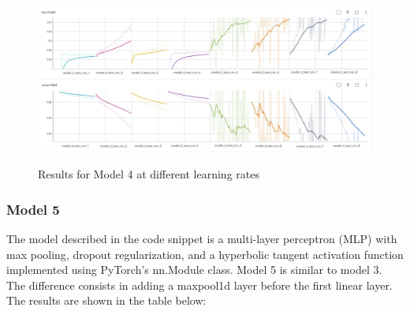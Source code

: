 
\begin{center}
    \begin{figure}[!ht]
        \centering
        \includegraphics[width=\textwidth]{images/exp1_acc4+loss4.jpg}
        \label{fig:exp1_model4}
        \caption{Results for Model 4 at different learning rates}
    \end{figure}
\end{center}

\subsubsection{Model 5}


The model described in the code snippet is a multi-layer perceptron (MLP) with max pooling, dropout regularization, and a hyperbolic tangent activation function implemented using PyTorch's nn.Module class. Model 5 is similar to model 3. The difference consists in adding a maxpool1d layer before the first linear layer. The results are shown in the table below:

